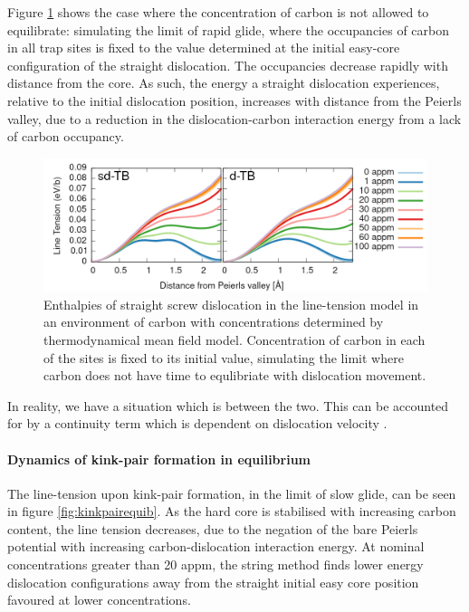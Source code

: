 \documentclass[a4paper,11pt]{article}
\numberwithin{equation}{chapter}
\numberwithin{listing}{chapter}
\begin{document}
Figure \ref{fig:straighttbstatic} shows the case where the concentration of
carbon is not allowed to equilibrate: simulating the limit of rapid glide,
where the occupancies of carbon in all trap sites is fixed to the value
determined at the initial easy-core configuration of the straight
dislocation. The occupancies decrease rapidly with distance from the
core. As such, the energy a straight dislocation experiences, relative to the initial
dislocation position, increases with
distance from the Peierls valley, due to a reduction in the
dislocation-carbon interaction energy from a lack of carbon occupancy.


\begin{figure}[htbp]
\centering
\includegraphics[width=.97\linewidth]{iron/Images/straight_line_enthalpies_static_both.png}
\caption{Enthalpies of straight screw dislocation in the line-tension model in an environment of carbon with concentrations determined by thermodynamical mean field model. Concentration of carbon in each of the sites is fixed to its initial value, simulating the limit where carbon does not have time to equlibriate with dislocation movement. \label{fig:straighttbstatic}}
\end{figure}

In reality, we have a situation which is between the two. This can be accounted for by
a continuity term which is dependent on dislocation velocity \cite{Gong2020}.

\paragraph{Dynamics of kink-pair formation in equilibrium}
\label{sec:org05549fe}
\label{sec:kinkpairformationequib}
The line-tension upon kink-pair formation, in the limit of slow glide, can
be seen in figure \ref{fig:kinkpairequib}. As the hard core is stabilised with
increasing carbon content, the line tension decreases, due to the negation
of the bare Peierls potential with increasing carbon-dislocation interaction
energy. At nominal concentrations greater than 20 appm, the string method
finds lower energy dislocation configurations away from the straight initial
easy core position favoured at lower concentrations.
\end{document}
